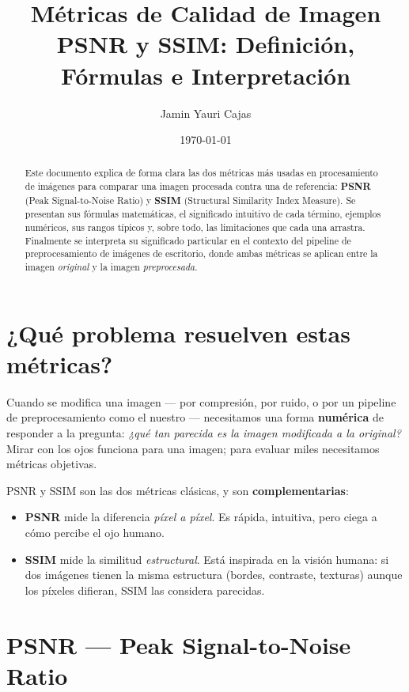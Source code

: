 \documentclass[11pt,a4paper]{article}
\title{
    \vspace{-1.5cm}
    \textbf{Métricas de Calidad de Imagen} \\[0.3cm]
    \Large PSNR y SSIM: Definición, Fórmulas e Interpretación
}
\author{Jamin Yauri Cajas}
\date{\today}
\begin{document}
\maketitle

\begin{abstract}
\noindent
Este documento explica de forma clara las dos métricas más usadas en procesamiento
de imágenes para comparar una imagen procesada contra una de referencia:
\textbf{PSNR} (Peak Signal-to-Noise Ratio) y \textbf{SSIM} (Structural Similarity
Index Measure). Se presentan sus fórmulas matemáticas, el significado intuitivo
de cada término, ejemplos numéricos, sus rangos típicos y, sobre todo, las
limitaciones que cada una arrastra. Finalmente se interpreta su significado
particular en el contexto del pipeline de preprocesamiento de imágenes de
escritorio, donde ambas métricas se aplican entre la imagen \emph{original} y
la imagen \emph{preprocesada}.
\end{abstract}

\section{¿Qué problema resuelven estas métricas?}

Cuando se modifica una imagen — por compresión, por ruido, o por un pipeline de
preprocesamiento como el nuestro — necesitamos una forma \textbf{numérica} de
responder a la pregunta: \emph{¿qué tan parecida es la imagen modificada a la
original?} Mirar con los ojos funciona para una imagen; para evaluar miles
necesitamos métricas objetivas.

PSNR y SSIM son las dos métricas clásicas, y son \textbf{complementarias}:

\begin{itemize}
    \item \textbf{PSNR} mide la diferencia \emph{píxel a píxel}. Es rápida, intuitiva,
          pero ciega a cómo percibe el ojo humano.
    \item \textbf{SSIM} mide la similitud \emph{estructural}. Está inspirada en la
          visión humana: si dos imágenes tienen la misma estructura (bordes,
          contraste, texturas) aunque los píxeles difieran, SSIM las considera
          parecidas.
\end{itemize}

\section{\textcolor{azulPSNR}{PSNR} — Peak Signal-to-Noise Ratio}
\end{document}
